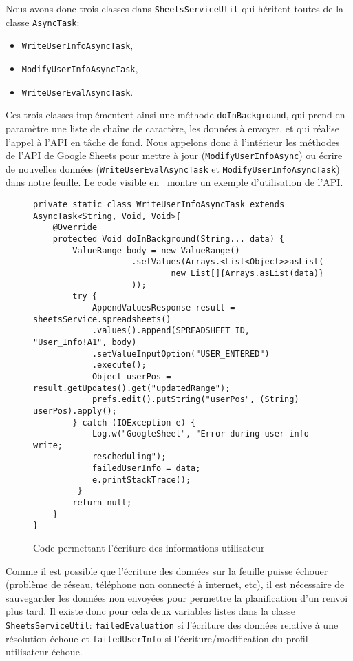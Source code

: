 \documentclass[../main.tex]{subfiles}
\begin{document}
Nous avons donc trois classes dans \texttt{SheetsServiceUtil} qui héritent toutes de la classe \texttt{AsyncTask}:
\begin{itemize}
\item \texttt{WriteUserInfoAsyncTask},
\item \texttt{ModifyUserInfoAsyncTask},
\item \texttt{WriteUserEvalAsyncTask}.
\end{itemize}
Ces trois classes implémentent ainsi une méthode \texttt{doInBackground}, qui prend en paramètre une liste de chaîne de caractère, les données à envoyer, et qui réalise l'appel à l'API en tâche de fond. Nous appelons donc à l'intérieur les méthodes de l’API de Google Sheets pour mettre à jour (\texttt{ModifyUserInfoAsync}) ou écrire de nouvelles données (\texttt{WriteUserEvalAsyncTask} et \texttt{ModifyUserInfoAsyncTask}) dans notre feuille. Le code visible en~ montre un exemple d'utilisation de l'API.\\
\begin{figure}[ht!]
\begin{lstlisting}[tabsize=3]
private static class WriteUserInfoAsyncTask extends 
AsyncTask<String, Void, Void>{
	@Override
	protected Void doInBackground(String... data) {
		ValueRange body = new ValueRange()
                    .setValues(Arrays.<List<Object>>asList(
                            new List[]{Arrays.asList(data)}
                    ));
		try {
			AppendValuesResponse result = sheetsService.spreadsheets()
			.values().append(SPREADSHEET_ID, "User_Info!A1", body)
			.setValueInputOption("USER_ENTERED")
			.execute();
			Object userPos = result.getUpdates().get("updatedRange");
			prefs.edit().putString("userPos", (String) userPos).apply();
		} catch (IOException e) {
			Log.w("GoogleSheet", "Error during user info write; 
			rescheduling");
			failedUserInfo = data;
			e.printStackTrace();
		 }
		return null;
	}
}
\end{lstlisting}
\caption{Code permettant l'écriture des informations utilisateur}
\label{fig-writeuser}
\end{figure}

Comme il est possible que l’écriture des données sur la feuille puisse échouer (problème de réseau, téléphone non connecté à internet, etc), il est nécessaire de sauvegarder les données non envoyées pour permettre la planification d'un renvoi plus tard. Il existe donc pour cela deux variables listes dans la classe \texttt{SheetsServiceUtil}: \texttt{failedEvaluation} si l'écriture des données relative à une résolution échoue et \texttt{failedUserInfo} si l'écriture/modification du profil utilisateur échoue. 
\end{document}
